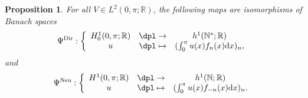 \documentclass[JEP,XML,SOM,Unicode,NoEqCountersInSection,published]{cedram}
\newcommand\mto{\mathchoice{\longmapsto}{\mapsto}{\mapsto}{\mapsto}}
\newtheorem{proposition}[theorem]{Proposition}
\theoremstyle{definition}
\begin{document}
\begin{proposition}
\label{prop_isom_Hilb}
For all $V\in L^2(0,\pi;\mathbb{R})$, the following maps are isomorphisms of Banach spaces
\[
\Psi^{\mathrm{Dir}}:\left\{ \begin{array}{ccc} H^1_0(0,\pi;\mathbb{R}) & \dpl\to & h^1(\mathbb{N}^*;\mathbb{R}) \\
u & \dpl\mto & (\int_0^\pi u(x) f_n(x) \mathrm{d}x)_n,
\end{array} \right.
\]
and
\[
\Psi^{\mathrm{Neu}}:\left\{ \begin{array}{ccc} H^1(0,\pi;\mathbb{R}) & \dpl\to & h^1(\mathbb{N};\mathbb{R}) \\
u & \dpl\mto & (\int_0^\pi u(x) f_{-n}(x) \mathrm{d}x)_n.
\end{array} \right.
\]
\end{proposition}
\end{document}
